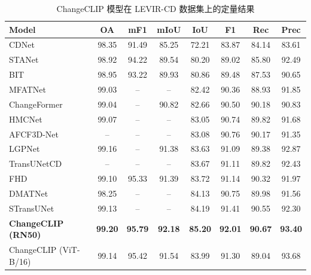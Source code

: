 \begin{table}[!htbp]
  \centering
  \caption{ChangeCLIP 模型在 LEVIR-CD 数据集上的定量结果}
  \label{tab:changeclip_levir}
  \begin{tabular*}{\textwidth}{@{\extracolsep{\fill}} l c c c c c c c}
    \toprule
    Model & OA & mF1 & mIoU & IoU & F1 & Rec & Prec \\
    \midrule
    CDNet~\cite{Alcantarilla2016StreetviewCD}                         & 98.35 & 91.49 & 85.25 & 72.21 & 83.87 & 84.14 & 83.61 \\
    STANet~\cite{chen_spatial-temporal_2020}                        & 98.92 & 94.22 & 89.54 & 80.20 & 89.02 & 85.80 & 92.49 \\
    BIT~\cite{chen_remote_2022}                           & 98.95 & 93.22 & 89.93 & 80.86 & 89.48 & 87.53 & 90.65 \\
    MFATNet~\cite{Mao2022MFATNetMF}                       & 99.03 & --    & --    & 82.42 & 90.36 & 88.93 & 91.85 \\
    ChangeFormer~\cite{bandara2022transformer}                  & 99.04 & --    & 90.82 & 82.66 & 90.50 & 90.18 & 90.83 \\
    HMCNet~\cite{Wang2022HMCNetHE}                        & 99.07 & --    & --    & 83.05 & 90.74 & 89.82 & 91.68 \\
    AFCF3D-Net~\cite{Ye2023AdjacentLevelFC}                    & --    & --    & --    & 83.08 & 90.76 & 90.17 & 91.35 \\
    LGPNet~\cite{Liu2022BuildingCD}                        & 99.16 & --    & 91.38 & 83.63 & 91.09 & 89.38 & 92.87 \\
    TransUNetCD~\cite{Li2022TransUNetCDAH}                   & --    & --    & --    & 83.67 & 91.11 & 89.82 & 92.43 \\
    FHD~\cite{pei_feature_2022}                           & 99.10 & 95.33 & 91.39 & 83.72 & 91.14 & 90.32 & 91.97 \\
    DMATNet~\cite{Song2022RemoteSI}                       & 98.25 & --    & --    & 84.13 & 90.75 & 89.98 & 91.56 \\
    STransUNet~\cite{Yuan2022STransUNetAS}                    & 99.13 & --    & --    & 84.19 & 91.41 & 90.55 & 92.30 \\
    \textbf{ChangeCLIP (RN50)}    & \textbf{99.20} & \textbf{95.79} & \textbf{92.18} & \textbf{85.20} & \textbf{92.01} & \textbf{90.67} & \textbf{93.40} \\
    ChangeCLIP (ViT-B/16)         & 99.14 & 95.42 & 91.54 & 83.99 & 91.30 & 89.04 & 93.68 \\
    \bottomrule
  \end{tabular*}
\end{table}

